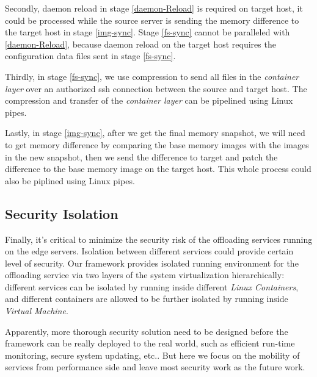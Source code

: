 Secondly, daemon reload in stage \ref{daemon-Reload} is required on target host, it could be processed while the source server is sending the memory difference to the target host in stage \ref{img-sync}. Stage \ref{fs-sync} cannot be paralleled with \ref{daemon-Reload}, because daemon reload on the target host requires the configuration data files sent in stage \ref{fs-sync}.

Thirdly,
in stage \ref{fs-sync}, we use compression to send all files in the \textit{container layer} over an authorized ssh connection between the source and target host. The compression and transfer of the \textit{container layer} can be pipelined using Linux pipes.

Lastly, in stage \ref{img-sync}, after we get the final memory snapshot, we will need to get memory difference by comparing the base memory images with the images in the new snapshot, then we send the difference to target and patch the difference to the base memory image on the target host. This whole process could also be piplined using Linux pipes. 



\subsection{Security Isolation}

Finally, it's critical to minimize the security risk of the offloading services running on the edge servers. Isolation between different services could provide certain level of security. Our framework provides isolated running environment for the offloading service via two layers of the system virtualization hierarchically: different services can be isolated by running inside different \textit{Linux Containers}, and different containers are allowed to be further isolated by running inside \textit{Virtual Machine}. 

Apparently, more thorough security solution need to be designed before the framework can be really deployed to the real world, such as efficient run-time monitoring, secure system updating, etc.. But here we focus on the mobility of services from performance side and leave most security work as the future work.



